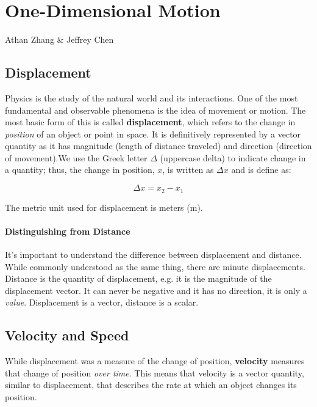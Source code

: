 \documentclass[11pt]{report}
\begin{document}
\chapter{One-Dimensional Motion}

Athan Zhang \& Jeffrey Chen

\section{Displacement}

Physics is the study of the natural world and its interactions. One of the most fundamental and observable phenomena is the idea of movement or motion. The most basic form of this is called \textbf{displacement}, which refers to the change in \textit{position} of an object or point in space. It is definitively represented by a vector quantity as it has magnitude (length of distance traveled) and direction (direction of movement).\footnotemark[1] We use the Greek letter $\Delta$ (uppercase delta) to indicate change in a quantity; thus, the change in position, $x$, is written as $\Delta x$ and is define as:

\begin{equation*}
    \Delta x = x_{2} - x_{1}
\end{equation*}

The metric unit used for displacement is meters (m).

\subsubsection*{Distinguishing from Distance}

It's important to understand the difference between displacement and distance. While commonly understood as the same thing, there are minute displacements. Distance is the quantity of displacement, e.g. it is the magnitude of the displacement vector. It can never be negative and it has no direction, it is only a \textit{value}. Displacement is a vector, distance is a scalar.

\section{Velocity and Speed}

While displacement was a measure of the change of position, \textbf{velocity} measures that change of position \textit{over time}. This means that velocity is a vector  quantity, similar to displacement, that describes the rate at which an object changes its position.\footnotemark[1]
\end{document}
